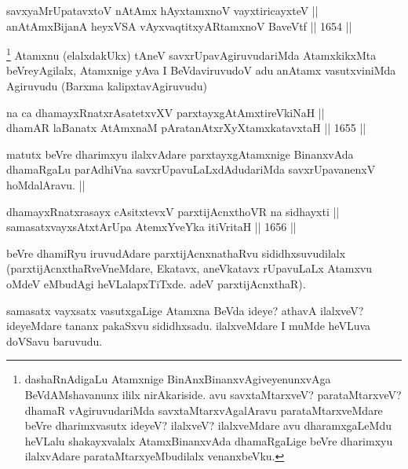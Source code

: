 
\begin{shl}
savxyaMrUpatavxtoV nA\s \s tAmx hAyxtamxnoV vayxtiricayxteV || \\
anAtAmxBijanA heyxVSA vAyxvaqtitxyAR\s \s tamxnoV BaveVtf \hfill || 1654 ||  
\end{shl}

\begin{artha}
\footnote{dashaRnAdigaLu Atamxnige BinAnxBinanxvAgiveyenunxvAga BeVdAMshavanunx ililx nirAkariside. avu savxtaMtarxveV? parataMtarxveV? dhamaR vAgiruvudariMda savxtaMtarxvAgalAravu parataMtarxveMdare beVre dharimxvasutx ideyeV? ilalxveV? ilalxveMdare avu dharamxgaLeMdu heVLalu shakayxvalalx AtamxBinanxvAda dhamaRgaLige beVre dharimxyu ilalxvAdare parataMtarxyeMbudilalx venanxbeVku.}
Atamxnu (elalxdakUkx) tAneV savxrUpavAgiruvudariMda AtamxkikxMta beVreyAgilalx, Atamxnige yAva I BeVdaviruvudoV adu anAtamx vasutxviniMda Agiruvudu (Barxma kalipxtavAgiruvudu)
\end{artha}

\begin{shl}
na ca dhamayxRnatxrAsatetxvXV parxtayxgAtAmxtireVkiNaH ||  \\
dhamAR laBanatx AtAmxnaM pAratanAtxrXyXtamxkatavxtaH \hfill || 1655 ||  
\end{shl}

\begin{artha}
matutx beVre dharimxyu ilalxvAdare parxtayxgAtamxnige BinanxvAda dhamaRgaLu parAdhiVna savxrUpavuLaLxdAdudariMda savxrUpavanenxV hoMdalAravu. ||
\end{artha}

\begin{shl}
dhamayxRnatxrasayx cAsitxtevxV parxtijAcnxthoVR na sidhayxti || \\
samasatxvayxsAtxtArUpa AtemxYveYka itiVritaH \hfill || 1656 ||  
\end{shl}

\begin{artha}
beVre dhamiRyu iruvudAdare parxtijAcnxnathaRvu sididhxsuvudilalx (parxtijAcnxthaRveVneMdare, Ekatavx, aneVkatavx rUpavuLaLx Atamxvu oMdeV eMbudAgi heVLalapxTiTxde. adeV parxtijAcnxthaR).
\end{artha}

\begin{artha}
samasatx vayxsatx vasutxgaLige Atamxna BeVda ideye? athavA ilalxveV? ideyeMdare tananx pakaSxvu sididhxsadu. ilalxveMdare I muMde heVLuva doVSavu baruvudu.
\end{artha}

